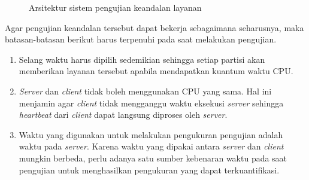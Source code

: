 \begin{figure}[!ht]
	\centering
	\vspace{20pt}
	\caption{Arsitektur sistem pengujian keandalan layanan}
	\label{figure:server_client_testing_arch}
\end{figure}

Agar pengujian keandalan tersebut dapat bekerja sebagaimana seharusnya, maka batasan-batasan
berikut harus terpenuhi pada saat melakukan pengujian.

\begin{enumerate}

	\item Selang waktu harus dipilih sedemikian sehingga setiap partisi akan memberikan
		layanan tersebut apabila mendapatkan kuantum waktu CPU.

	\item \textit{Server} dan \textit{client} tidak boleh menggunakan CPU yang sama. Hal ini
		menjamin agar \textit{client} tidak mengganggu waktu eksekusi \textit{server}
		sehingga \textit{heartbeat} dari \textit{client} dapat langsung diproses oleh
		\textit{server}.
	
	\item Waktu yang digunakan untuk melakukan pengukuran pengujian adalah waktu pada
		\textit{server}. Karena waktu yang dipakai antara \textit{server} dan
		\textit{client} mungkin berbeda, perlu adanya satu sumber kebenaran waktu pada
		saat pengujian untuk menghasilkan pengukuran yang dapat terkuantifikasi.

\end{enumerate}

